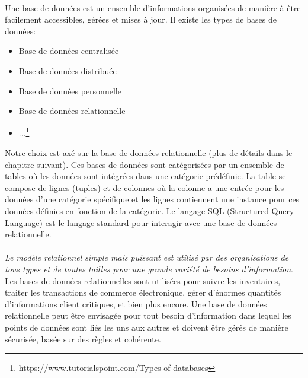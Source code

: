                 \paragraph{}
                Une base de données est un ensemble d'informations organisées de manière 
                à être facilement accessibles, gérées et mises à jour. Il existe les types de bases de données:
                \begin{itemize}
                        \item Base de données centralisée
                        \item Base de données distribuée
                        \item Base de données personnelle
                        \item Base de données relationnelle
                        \item ...\footnote{https://www.tutorialspoint.com/Types-of-databases}
                \end{itemize}
                Notre choix est axé sur la base de données relationnelle (plus de détails dans le chapitre suivant).
                Ces bases de données sont catégorisées par un ensemble de tables où les données 
                sont intégrées dans une catégorie prédéfinie. La table se compose de lignes (tuples)
                et de colonnes où la colonne a une entrée pour les données d'une catégorie spécifique 
                et les lignes contiennent une instance pour ces données définies en fonction de la catégorie. 
                Le langage SQL (Structured Query Language) est le langage standard pour interagir avec
                 une base de données relationnelle.
                 \paragraph{}
                 \textit{Le modèle relationnel simple mais puissant est utilisé par des organisations 
                 de tous types et de toutes tailles pour une grande variété de besoins d'information}\cite{Oracle}.
                  Les bases de données relationnelles sont utilisées pour suivre les inventaires, 
                  traiter les transactions de commerce électronique, gérer d'énormes quantités d'informations
                   client critiques, et bien plus encore. Une base de données relationnelle peut être envisagée 
                   pour tout besoin d'information dans lequel les points de données sont liés les uns 
                   aux autres et doivent être gérés de manière sécurisée, basée sur des règles et cohérente.

